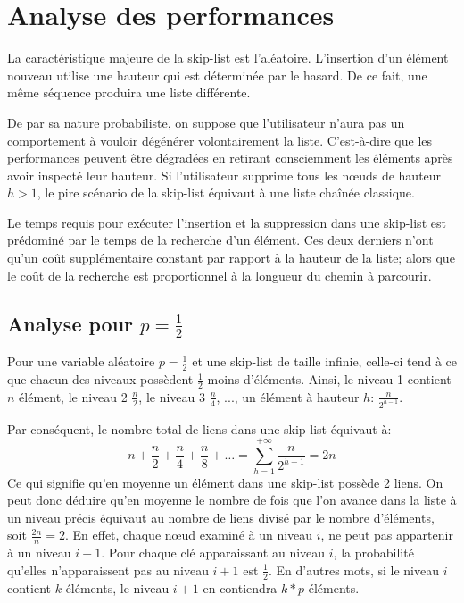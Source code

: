 \documentclass[hidelinks,a4paper, 12pt]{article}
\begin{document}
	\newpage
	\section{Analyse des performances}\label{perf}
	La caractéristique majeure de la skip-list est l'aléatoire. L'insertion d'un élément nouveau utilise une hauteur qui est déterminée par le hasard. De ce fait, une même séquence produira une liste différente.
	
	De par sa nature probabiliste, on suppose que l'utilisateur n'aura pas un comportement à vouloir dégénérer volontairement la liste. C'est-à-dire que les performances peuvent être dégradées en retirant consciemment les éléments après avoir inspecté leur hauteur. Si l'utilisateur supprime tous les nœuds de hauteur $h>1$, le pire scénario de la skip-list équivaut à une liste chaînée classique.
	
	Le temps requis pour exécuter l'insertion et la suppression dans une skip-list est prédominé par le temps de la recherche d'un élément. Ces deux derniers n'ont qu'un coût supplémentaire constant par rapport à la hauteur de la liste; alors que le coût de la recherche est proportionnel à la longueur du chemin à parcourir.
	
	
	\subsection{Analyse pour $p=\frac{1}{2}$}
	Pour une variable aléatoire $p=\frac{1}{2}$ et une skip-list de taille infinie, celle-ci tend à ce que chacun des niveaux possèdent $\frac{1}{2}$ moins d'éléments. Ainsi, le niveau 1 contient $n$ élément, le niveau 2 $\frac{n}{2}$, le niveau 3 $\frac{n}{4}$, ..., un élément à hauteur $h$: $\frac{n}{{2}^{h-1}}$.
	
	Par conséquent, le nombre total de liens dans une skip-list équivaut à: \[n+\frac{n}{2}+\frac{n}{4}+\frac{n}{8}+\dots = \sum_{h=1}^{+\infty}\frac{n}{{2}^{h-1}}=2n\] Ce qui signifie qu'en moyenne un élément dans une skip-list possède 2 liens. On peut donc déduire qu'en moyenne le nombre de fois que l'on avance dans la liste à un niveau précis équivaut au nombre de liens divisé par le nombre d'éléments, soit $\frac{2n}{n}=2$. En effet, chaque nœud examiné à un niveau $i$, ne peut pas appartenir à un niveau $i+1$. Pour chaque clé apparaissant au niveau $i$, la probabilité qu'elles n'apparaissent pas au niveau $i+1$ est $\frac{1}{2}$. En d'autres mots, si le niveau $i$ contient $k$ éléments, le niveau $i+1$ en contiendra $k*p$ éléments.
	
\end{document}
